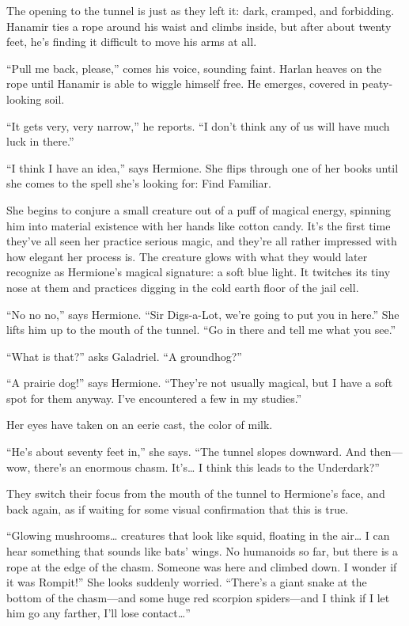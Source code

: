 \documentclass[smalldemyvopaper,11pt,twoside,onecolumn,openright,extrafontsizes]{memoir}
\begin{document}
The opening to the tunnel is just as they left it: dark, cramped, and
forbidding. Hanamir ties a rope around his waist and climbs inside, but
after about twenty feet, he's finding it difficult to move his arms at
all.

``Pull me back, please,'' comes his voice, sounding faint. Harlan heaves
on the rope until Hanamir is able to wiggle himself free. He emerges,
covered in peaty-looking soil.

``It gets very, very narrow,'' he reports. ``I don't think any of us
will have much luck in there.''

``I think I have an idea,'' says Hermione. She flips through one of her
books until she comes to the spell she's looking for: Find Familiar.

She begins to conjure a small creature out of a puff of magical energy,
spinning him into material existence with her hands like cotton candy.
It's the first time they've all seen her practice serious magic, and
they're all rather impressed with how elegant her process is. The
creature glows with what they would later recognize as Hermione's
magical signature: a soft blue light. It twitches its tiny nose at them
and practices digging in the cold earth floor of the jail cell.

``No no no,'' says Hermione. ``Sir Digs-a-Lot, we're going to put you in
here.'' She lifts him up to the mouth of the tunnel. ``Go in there and
tell me what you see.''

``What is that?'' asks Galadriel. ``A groundhog?''

``A prairie dog!'' says Hermione. ``They're not usually magical, but I
have a soft spot for them anyway. I've encountered a few in my
studies.''

Her eyes have taken on an eerie cast, the color of milk.

``He's about seventy feet in,'' she says. ``The tunnel slopes downward.
And then---wow, there's an enormous chasm. It's\ldots{} I think this
leads to the Underdark?''

They switch their focus from the mouth of the tunnel to Hermione's face,
and back again, as if waiting for some visual confirmation that this is
true.

``Glowing mushrooms\ldots{} creatures that look like squid, floating in
the air\ldots{} I can hear something that sounds like bats' wings. No
humanoids so far, but there is a rope at the edge of the chasm. Someone
was here and climbed down. I wonder if it was Rompit!'' She looks
suddenly worried. ``There's a giant snake at the bottom of the
chasm---and some huge red scorpion spiders---and I think if I let him go
any farther, I'll lose contact\ldots{}''
\end{document}
